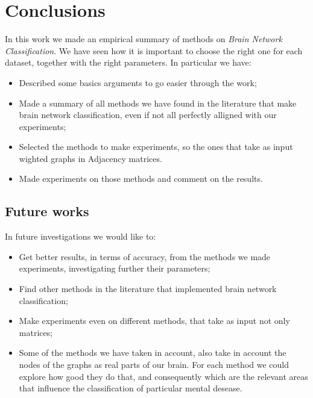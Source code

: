 \chapter{Conclusions}
\label{chap:4}

In this work we made an empirical summary of methods on \textit{Brain Network Classification}. We have seen how it is important to choose the right one for each dataset, together with the right parameters. In particular we have:

\begin{itemize}
	\item Described some basics arguments to go easier through the work;
	\item Made a summary of all methods we have found in the literature that make brain network classification, even if not all perfectly alligned with our experiments;
	\item Selected the methods to make experiments, so the ones that take as input wighted graphs in Adjacency matrices.
	\item Made experiments on those methods and comment on the results.
\end{itemize}

\section{Future works}

In future investigations we would like to:

\begin{itemize}
	\item Get better results, in terms of accuracy, from the methods we made experiments, investigating further their parameters;
	\item Find other methods in the literature that implemented brain network classification;
	\item Make experiments even on different methods, that take as input not only matrices;
	\item Some of the methods we have taken in account, also take in account the nodes of the graphs as real parts of our brain. For each method we could explore how good they do that, and consequently which are the relevant areas that influence the classification of particular mental desease. 
\end{itemize}